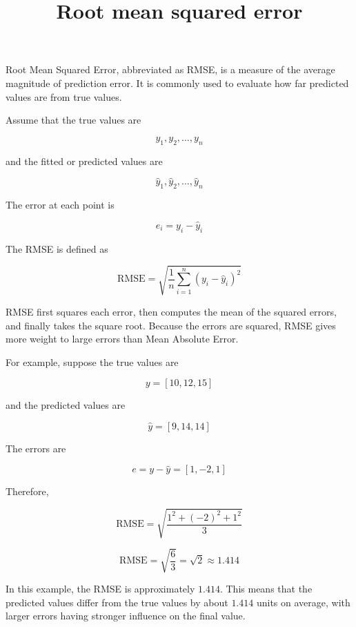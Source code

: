 \documentclass[a4paper]{article}
\title{Root mean squared error}
\date{}
\begin{document}
    \maketitle
    Root Mean Squared Error, abbreviated as RMSE, is a measure of the average magnitude of prediction error. It is commonly used to evaluate how far predicted values are from true values.
    
    Assume that the true values are
    
    \[
        y_1, y_2, \ldots, y_n
    \]
    
    and the fitted or predicted values are
    
    \[
        \hat{y}_1, \hat{y}_2, \ldots, \hat{y}_n
    \]
    
    The error at each point is
    
    \[
        e_i = y_i - \hat{y}_i
    \]
    
    The RMSE is defined as
    
    \[
        \mathrm{RMSE}
        =
        \sqrt{
            \frac{1}{n}
            \sum_{i=1}^{n}
            (
            y_i - \hat{y}_i
            )^2
        }
    \]
    
    RMSE first squares each error, then computes the mean of the squared errors, and finally takes the square root. Because the errors are squared, RMSE gives more weight to large errors than Mean Absolute Error.
    
    For example, suppose the true values are
    
    \[
        y = [10, 12, 15]
    \]
    
    and the predicted values are
    
    \[
        \hat{y} = [9, 14, 14]
    \]
    
    The errors are
    
    \[
        e = y - \hat{y} = [1, -2, 1]
    \]
    
    Therefore,
    
    \[
        \mathrm{RMSE}
        =
        \sqrt{
            \frac{
                1^2 + (-2)^2 + 1^2
            }{3}
        }
    \]
    
    \[
        \mathrm{RMSE}
        =
        \sqrt{
            \frac{6}{3}
        }
        =
        \sqrt{2}
        \approx 1.414
    \]
    
    In this example, the RMSE is approximately \(1.414\). This means that the predicted values differ from the true values by about \(1.414\) units on average, with larger errors having stronger influence on the final value.
%    
%    
\end{document}
